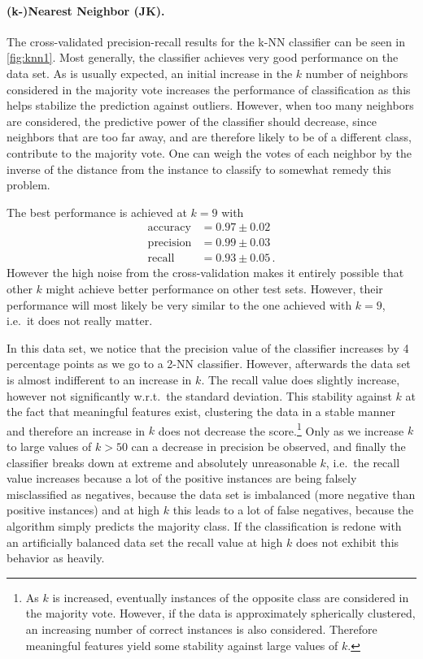 \documentclass[12pt, a4paper]{scrartcl}
\begin{document}

\paragraph{(k-)Nearest Neighbor (JK).} The cross-validated precision-recall results for the k-NN classifier can be seen in \cref{fig:knn1}. Most generally, the classifier achieves very good performance on the data set.
As is usually expected, an initial increase in the $k$ number of neighbors considered in the majority vote increases the performance of classification as this helps stabilize the prediction against outliers. However, when too many neighbors are considered, the predictive power of the classifier should decrease, since neighbors that are too far away, and are therefore likely to be of a different class, contribute to the majority vote. One can weigh the votes of each neighbor by the inverse of the distance from the instance to classify to somewhat remedy this problem.

The best performance is achieved at $k=9$ with 
\begin{align*}
	\text{accuracy} &= 0.97 \pm 0.02 \\
	\text{precision} &= 0.99 \pm 0.03 \\
	\text{recall} &= 0.93 \pm 0.05 \, .
\end{align*}
However the high noise from the cross-validation makes it entirely possible that other $k$ might achieve better performance on other test sets. However, their performance will most likely be very similar to the one achieved with $k=9$, i.e.\  it does not really matter.

In this data set, we notice that the precision value of the classifier increases by 4 percentage points as we go to a 2-NN classifier. However, afterwards the data set is almost indifferent to an increase in $k$.  The recall value does slightly increase, however not significantly w.r.t.\ the standard deviation. This stability against $k$ at the fact that meaningful features exist, clustering the data in a stable manner and therefore an increase in $k$ does not decrease the score.\footnote{As $k$ is increased, eventually instances of the opposite class are considered in the majority vote. However, if the data is approximately spherically clustered, an increasing number of correct instances is also considered. Therefore meaningful features yield some stability against large values of $k$.}
Only as we increase $k$ to large values of $k>50$ can a decrease in precision be observed, and finally the classifier breaks down at extreme and absolutely unreasonable $k$, i.e.\  the recall value increases because a lot of the positive instances are being falsely misclassified as negatives, because the data set is imbalanced (more negative than positive instances) and at high $k$ this leads to a lot of false negatives, because the algorithm simply predicts the majority class. If the classification is redone with an artificially balanced data set the recall value at high $k$ does not exhibit this behavior as heavily.
\end{document}
